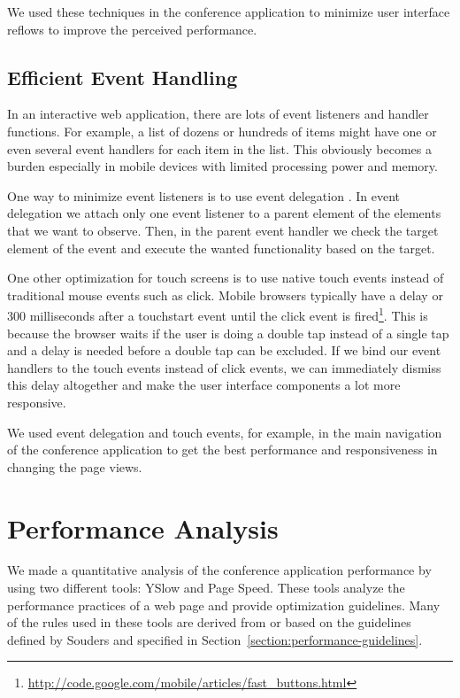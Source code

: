 We used these techniques in the conference application to minimize
user interface reflows to improve the perceived performance.

\subsection{Efficient Event Handling}

In an interactive web application, there are lots of event listeners
and handler functions. For example, a list of dozens or hundreds of
items might have one or even several event handlers for each item in
the list. This obviously becomes a burden especially in mobile devices
with limited processing power and memory.

One way to minimize event listeners is to use event delegation
\cite{zakas2010high}. In event delegation we attach only one event
listener to a parent element of the elements that we want to
observe. Then, in the parent event handler we check the target element
of the event and execute the wanted functionality based on the target.

One other optimization for touch screens is to use native touch events
instead of traditional mouse events such as click. Mobile browsers
typically have a delay or 300 milliseconds after a touchstart event
until the click event is
fired\footnote{\url{http://code.google.com/mobile/articles/fast_buttons.html}}. This
is because the browser waits if the user is doing a double tap instead
of a single tap and a delay is needed before a double tap can be
excluded. If we bind our event handlers to the touch events instead of
click events, we can immediately dismiss this delay altogether and
make the user interface components a lot more responsive.

We used event delegation and touch events, for example, in the main
navigation of the conference application to get the best performance
and responsiveness in changing the page views.

\section{Performance Analysis}
\label{section:performance-analysis}

We made a quantitative analysis of the conference application
performance by using two different tools: YSlow and Page Speed. These
tools analyze the performance practices of a web page and provide
optimization guidelines. Many of the rules used in these tools are
derived from or based on the guidelines defined by Souders
\cite{souders2007high, souders2009even} and specified in
Section~\ref{section:performance-guidelines}.

